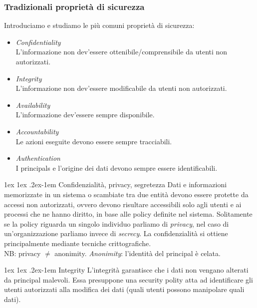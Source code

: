 \documentclass[a4paper, 11pt, notitlepage, fleqn]{report}
\makeatletter
\renewcommand{\paragraph}{%
	\@startsection{paragraph}{4}%
	{\z@}{1ex \@plus 1ex \@minus .2ex}{-1em}%
	{\normalfont\normalsize\bfseries}%
}
\makeatother
\begin{document}
\subsubsection{Tradizionali proprietà di sicurezza}
Introduciamo e studiamo le più comuni proprietà di sicurezza:
\begin{itemize}[itemsep=0pt]
	\item \emph{Confidentiality}\\
	L'informazione non dev'essere ottenibile/comprensibile da utenti non autorizzati.
	\item \emph{Integrity}\\
	L'informazione non dev'essere modificabile da utenti non autorizzati.
	\item \emph{Availability}\\
	L'informazione dev'essere sempre disponibile.
	\item \emph{Accountability}\\
	Le azioni eseguite devono essere sempre tracciabili.
	\item \emph{Authentication}\\
	I principals e l'origine dei dati devono sempre essere identificabili.
\end{itemize}

\paragraph{Confidenzialità, privacy, segretezza}
Dati e informazioni memorizzate in un sistema o scambiate tra due entità devono essere protette da accessi non autorizzati, ovvero devono risultare accessibili solo agli utenti e ai processi che ne hanno diritto, in base alle policy definite nel sistema. Solitamente se la policy riguarda un singolo individuo parliamo di \emph{privacy}, nel caso di un'organizzazione parliamo invece di \emph{secrecy}. La confidenzialità si ottiene principalmente mediante tecniche crittografiche.\\
NB: privacy $\neq$ anonimity. \emph{Anonimity}: l'identità del principal è celata.

\paragraph{Integrity}
L'integrità garantisce che i dati non vengano alterati da principal malevoli. Essa presuppone una security polity atta ad identificare gli utenti autorizzati alla modifica dei dati (quali utenti possono manipolare quali dati).
\end{document}
